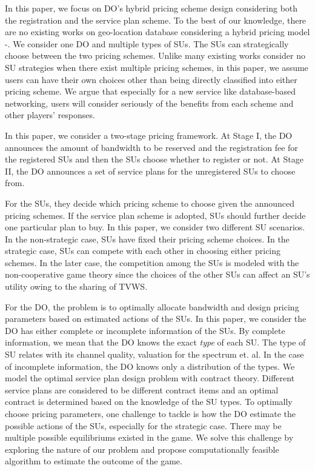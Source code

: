 \documentclass[journal]{IEEEtran}
\begin{document}
In this paper, we focus on DO's hybrid pricing scheme design considering both the registration and the service plan scheme. To the best of our knowledge, there are no existing works on geo-location database considering a hybrid pricing model \cite{database_dyspan08}-\cite{database_icc12}.
We consider one DO and multiple types of SUs. The SUs can strategically choose between the two pricing schemes. Unlike many existing works consider no SU strategies when there exist multiple pricing schemes, in this paper, we assume users can have their own choices other than being directly classified into either pricing scheme. We argue that especially for a new service like database-based networking, users will consider seriously of the benefits from each scheme and other players' responses.

In this paper, we consider a two-stage pricing framework. At Stage I, the DO announces the amount of bandwidth to be reserved and the registration fee for the registered SUs and then the SUs choose whether to register or not. At Stage II, the DO announces a set of service plans for the unregistered SUs to choose from.

For the SUs, they decide which pricing scheme to choose given the announced pricing schemes. If the service plan scheme is adopted, SUs should further decide one particular plan to buy. In this paper, we consider two different SU scenarios. In the non-strategic case, SUs have fixed their pricing scheme choices. In the strategic case, SUs can compete with each other in choosing either pricing schemes.
In the later case, the competition among the SUs is modeled with the non-cooperative game theory since the choices of the other SUs can affect an SU's utility owing to the sharing of TVWS.

For the DO, the problem is to optimally allocate bandwidth and design pricing parameters based on estimated actions of the SUs. In this paper, we consider the DO has either complete or incomplete information of the SUs. By complete information, we mean that the DO knows the exact \emph{type} of each SU. The type of SU relates with its channel quality, valuation for the spectrum et. al. In the case of incomplete information, the DO knows only a distribution of the types. We model the optimal service plan design problem with contract theory. Different service plans are considered to be different contract items and an optimal contract is determined based on the knowledge of the SU types. To optimally choose pricing parameters, one challenge to tackle is how the DO estimate the possible actions of the SUs, especially for the strategic case. There may be multiple possible equilibriums existed in the game. We solve this challenge by exploring the nature of our problem and propose computationally feasible algorithm to estimate the outcome of the game.
\end{document}

